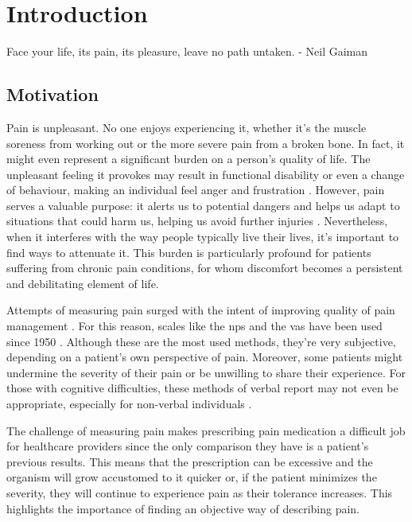 \chapter{Introduction}%
\label{chapter:introduction}

\begin{introduction}
Face your life, its pain, its pleasure, leave no path untaken. - Neil Gaiman
\end{introduction}


\section{Motivation}
Pain is unpleasant. No one enjoys experiencing it, whether it's the muscle soreness from working out or the more severe pain from a broken bone. In fact, it might even represent a significant burden on a person's quality of life. The unpleasant feeling it provokes may result in functional disability or even a change of behaviour, making an individual feel anger and frustration \cite{Dirk2021}. However, pain serves a valuable purpose: it alerts us to potential dangers and helps us adapt to situations that could harm us, helping us avoid further injuries \cite{Coninx2021}. Nevertheless, when it interferes with the way people typically live their lives, it's important to find ways to attenuate it. This burden is particularly profound for patients suffering from chronic pain conditions, for whom discomfort becomes a persistent and debilitating element of life.

Attempts of measuring pain surged with the intent of improving quality of pain management \cite{Nugent2021}. For this reason, scales like the \ac{nps} and the \ac{vas} have been used since 1950 \cite{Bielewicz2022}. Although these are the most used methods, they're very subjective, depending on a patient's own perspective of pain. Moreover, some patients might undermine the severity of their pain or be unwilling to share their experience. For those with cognitive difficulties, these methods of verbal report may not even be appropriate, especially for non-verbal individuals \cite{Qin2022}.

The challenge of measuring pain makes prescribing pain medication a difficult job for healthcare providers since the only comparison they have is a patient's previous results. This means that the prescription can be excessive and the organism will grow accustomed to it quicker or, if the patient minimizes the severity, they will continue to experience pain as their tolerance increases. This highlights the importance of finding an objective way of describing pain.






